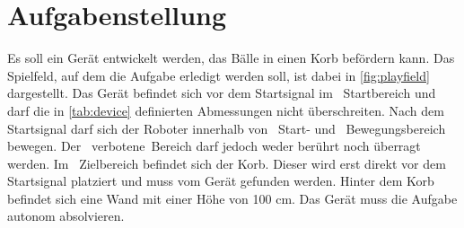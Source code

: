 \section{Aufgabenstellung}
\label{sec:aufgabe}
Es soll ein Gerät entwickelt werden, das Bälle in einen Korb befördern kann.  
Das Spielfeld, auf dem die Aufgabe erledigt werden soll, ist dabei in 
\autoref{fig:playfield} dargestellt. Das Gerät befindet sich vor dem 
Startsignal im \mbox{ 
Startbereich} und darf die in \autoref{tab:device} definierten Abmessungen 
nicht überschreiten. Nach dem Startsignal darf sich der Roboter innerhalb von 
\mbox{ Start}- und 
\mbox{ Bewegungsbereich} 
bewegen. Der \mbox{ 
verbotene Bereich} darf jedoch weder berührt noch überragt werden. Im 
\mbox{ Zielbereich} 
befindet sich der Korb. Dieser wird erst direkt vor dem Startsignal platziert 
und muss vom Gerät  gefunden werden. Hinter dem Korb befindet sich eine Wand 
mit einer Höhe von 100 cm. Das Gerät muss die Aufgabe autonom absolvieren. 
\cite{hslu:aufgabe}
